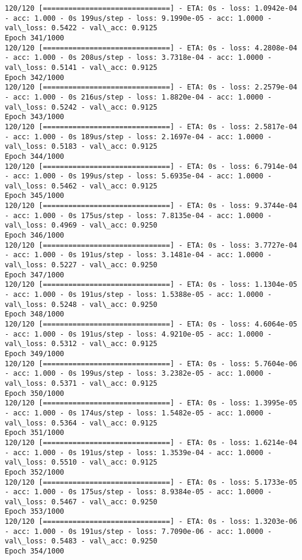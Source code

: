 \documentclass[11pt]{article}
\begin{document}
\begin{Verbatim}[commandchars=\\\{\}]
120/120 [==============================] - ETA: 0s - loss: 1.0942e-04 - acc: 1.000 - 0s 199us/step - loss: 9.1990e-05 - acc: 1.0000 - val\_loss: 0.5422 - val\_acc: 0.9125
Epoch 341/1000
120/120 [==============================] - ETA: 0s - loss: 4.2808e-04 - acc: 1.000 - 0s 208us/step - loss: 3.7318e-04 - acc: 1.0000 - val\_loss: 0.5141 - val\_acc: 0.9125
Epoch 342/1000
120/120 [==============================] - ETA: 0s - loss: 2.2579e-04 - acc: 1.000 - 0s 216us/step - loss: 1.8820e-04 - acc: 1.0000 - val\_loss: 0.5242 - val\_acc: 0.9125
Epoch 343/1000
120/120 [==============================] - ETA: 0s - loss: 2.5817e-04 - acc: 1.000 - 0s 189us/step - loss: 2.1697e-04 - acc: 1.0000 - val\_loss: 0.5183 - val\_acc: 0.9125
Epoch 344/1000
120/120 [==============================] - ETA: 0s - loss: 6.7914e-04 - acc: 1.000 - 0s 199us/step - loss: 5.6935e-04 - acc: 1.0000 - val\_loss: 0.5462 - val\_acc: 0.9125
Epoch 345/1000
120/120 [==============================] - ETA: 0s - loss: 9.3744e-04 - acc: 1.000 - 0s 175us/step - loss: 7.8135e-04 - acc: 1.0000 - val\_loss: 0.4969 - val\_acc: 0.9250
Epoch 346/1000
120/120 [==============================] - ETA: 0s - loss: 3.7727e-04 - acc: 1.000 - 0s 191us/step - loss: 3.1481e-04 - acc: 1.0000 - val\_loss: 0.5227 - val\_acc: 0.9250
Epoch 347/1000
120/120 [==============================] - ETA: 0s - loss: 1.1304e-05 - acc: 1.000 - 0s 191us/step - loss: 1.5388e-05 - acc: 1.0000 - val\_loss: 0.5248 - val\_acc: 0.9250
Epoch 348/1000
120/120 [==============================] - ETA: 0s - loss: 4.6064e-05 - acc: 1.000 - 0s 191us/step - loss: 4.9210e-05 - acc: 1.0000 - val\_loss: 0.5312 - val\_acc: 0.9125
Epoch 349/1000
120/120 [==============================] - ETA: 0s - loss: 5.7604e-06 - acc: 1.000 - 0s 199us/step - loss: 3.2382e-05 - acc: 1.0000 - val\_loss: 0.5371 - val\_acc: 0.9125
Epoch 350/1000
120/120 [==============================] - ETA: 0s - loss: 1.3995e-05 - acc: 1.000 - 0s 174us/step - loss: 1.5482e-05 - acc: 1.0000 - val\_loss: 0.5364 - val\_acc: 0.9125
Epoch 351/1000
120/120 [==============================] - ETA: 0s - loss: 1.6214e-04 - acc: 1.000 - 0s 191us/step - loss: 1.3539e-04 - acc: 1.0000 - val\_loss: 0.5510 - val\_acc: 0.9125
Epoch 352/1000
120/120 [==============================] - ETA: 0s - loss: 5.1733e-05 - acc: 1.000 - 0s 175us/step - loss: 8.9384e-05 - acc: 1.0000 - val\_loss: 0.5467 - val\_acc: 0.9250
Epoch 353/1000
120/120 [==============================] - ETA: 0s - loss: 1.3203e-06 - acc: 1.000 - 0s 191us/step - loss: 7.7090e-06 - acc: 1.0000 - val\_loss: 0.5483 - val\_acc: 0.9250
Epoch 354/1000

\end{Verbatim}
\end{document}
